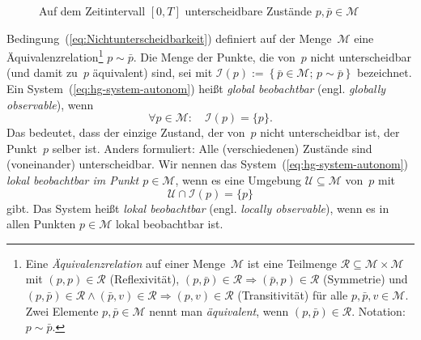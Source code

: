 \begin{figure}
\begin{centering}
\resizebox{0.8\textwidth}{!}{}
\par\end{centering}
\caption{Auf dem Zeitintervall $[0,T]$ unterscheidbare Zustände $p,\bar{p}\in\mathcal{M}$\label{fig:Unterscheidbarkeit}}

\end{figure}

Bedingung~(\ref{eq:Nichtunterscheidbarkeit}) definiert auf der Menge~$\mathcal{M}$
eine Äquivalenzrelation\footnote{Eine \emph{Äquivalenzrelation} auf einer Menge~$\mathcal{M}$ ist
eine Teilmenge $\mathcal{R}\subseteq\mathcal{M}\times\mathcal{M}$
mit $(p,p)\in\mathcal{R}$ (Reflexivität), $(p,\bar{p})\in\mathcal{R}\Rightarrow(\bar{p},p)\in\mathcal{R}$
(Symmetrie) und $(p,\bar{p})\in\mathcal{R}\wedge(\bar{p},v)\in\mathcal{R}\Rightarrow(p,v)\in\mathcal{R}$
(Transitivität) für alle $p,\bar{p},v\in\mathcal{M}$. Zwei Elemente
$p,\bar{p}\in\mathcal{M}$ nennt man \emph{äquivalent}, wenn $(p,\bar{p})\in\mathcal{R}$.
Notation: $p\sim\bar{p}$.} $p\sim\bar{p}$. Die Menge der Punkte, die von~$p$ nicht unterscheidbar
(und damit zu~$p$ äquivalent) sind, sei mit $\mathcal{I}(p):=\left\{ \bar{p}\in\mathcal{M};\,p\sim\bar{p}\right\} $
bezeichnet. Ein System~(\ref{eq:hg-system-autonom}) heißt \emph{global
beobachtbar} (engl. \emph{globally observable}),
wenn 
\[
\forall p\in\mathcal{M}:\quad\mathcal{I}(p)=\{p\}.
\]
Das bedeutet, dass der einzige Zustand, der von~$p$ nicht unterscheidbar
ist, der Punkt~$p$ selber ist. Anders formuliert: Alle (verschiedenen)
Zustände sind (voneinander) unterscheidbar. Wir nennen das System~(\ref{eq:hg-system-autonom})
\emph{lokal beobachtbar im Punkt $p\in\mathcal{M}$}, wenn es eine
Umgebung $\mathcal{U}\subseteq\mathcal{M}$ von~$p$ mit 
\[
\mathcal{U}\cap\mathcal{I}(p)=\{p\}
\]
gibt. Das System heißt \emph{lokal beobachtbar}
(engl. \emph{locally observable}), wenn es in allen Punkten $p\in\mathcal{M}$
lokal beobachtbar ist. 

